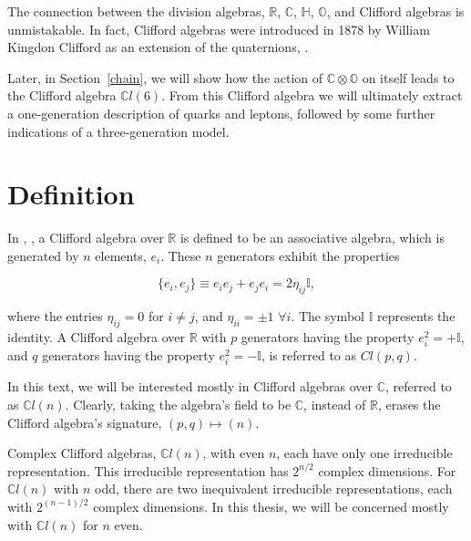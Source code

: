 \documentclass[letterpaper,12pt,titlepage,oneside,final]{book}
\newcommand{\CO}{\mathbb{C}\otimes\mathbb{O}}
\newcommand{\CLsix}{\mathbb{C}l(6)}
\newcommand{\CLn}{\mathbb{C}l(n)}
\begin{document}


The connection between the division algebras, $\mathbb{R}$, $\mathbb{C}$, $\mathbb{H}$, $\mathbb{O}$, and Clifford algebras is unmistakable.  In fact, Clifford algebras were introduced in 1878 by William Kingdon Clifford as an extension of the quaternions, \cite{cliff}.  


Later, in Section~\ref{chain}, we will show how the action of $\CO$ on itself leads to the Clifford algebra $\CLsix$.  From this Clifford algebra we will ultimately extract a one-generation description of quarks and leptons, followed by some further indications of a three-generation model.


\section{Definition  }

In \cite{paddy}, \cite{west}, a Clifford algebra over $\mathbb{R}$ is defined to be an associative algebra, which is generated by $n$ elements, $e_i$.  These $n$ generators exhibit the properties

\begin{equation}\label{CAdefn}
\{e_i, e_j \}\equiv e_ie_j + e_je_i = 2\eta_{ij} \mathbb{I}, 
\end{equation}

\noindent where the entries $\eta_{ij}=0$ for $i\neq j$, and $\eta_{ii} = \pm 1$ $\forall i$.  The symbol $\mathbb{I}$ represents the identity.   A Clifford algebra over $\mathbb{R}$ with $p$ generators having the property $e_i^2 = +\mathbb{I}$, and $q$ generators having the property $e_i^2 = -\mathbb{I}$, is referred to as $Cl(p,q)$.  

In this text, we will be interested mostly in Clifford algebras over $\mathbb{C}$, referred to as $\mathbb{C}l(n)$.  Clearly, taking the algebra's field to be $\mathbb{C}$, instead of $\mathbb{R}$, erases the Clifford algebra's signature, $(p,q)\mapsto(n)$.   




Complex Clifford algebras, $\CLn$, with even $n$, each have only one irreducible representation.  This irreducible representation has $2^{n/2}$ complex dimensions.  For $\CLn$ with $n$ odd, there are two inequivalent irreducible representations, each with $2^{(n-1)/2}$ complex dimensions.  In this thesis, we will be concerned mostly with $\mathbb{C}l(n)$ for $n$ even.
\end{document}
